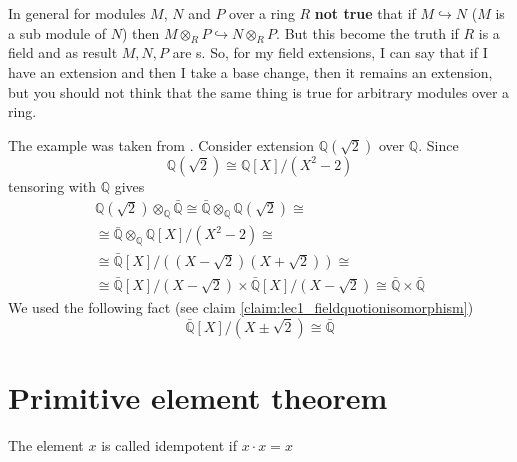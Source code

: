 \begin{remark}
In general for modules $M$, $N$ and $P$ over a ring $R$ \textbf{not true} that
if $M \hookrightarrow N$ ($M$ is a sub module of $N$) then
$M \otimes_R P \hookrightarrow N \otimes_R P$. But this become the
truth if $R$ is a field and as result $M,N,P$ are
s. So, for my field extensions, I can say
that if I have an extension and then I take a base change, then it
remains an extension, but  you should not think that the same thing is
true for arbitrary modules over a ring.  
\end{remark}

\begin{myexample}
  The example was taken from \cite{bib:KeithConradSeparability2}.
  Consider extension $\mathbb{Q}\left(\sqrt{2}\right)$ over
  $\mathbb{Q}$. Since
  \[
  \mathbb{Q}\left(\sqrt{2}\right) \cong
  \mathbb{Q}\left[X\right]/\left(X^2 - 2\right)
  \]
  tensoring with $\mathbb{Q}$ gives
  \begin{eqnarray}
    \mathbb{Q}\left(\sqrt{2}\right) \otimes_{\mathbb{Q}}
    \bar{\mathbb{Q}} \cong
    \bar{\mathbb{Q}} \otimes_{\mathbb{Q}}
    \mathbb{Q}\left(\sqrt{2}\right)
    \cong
    \nonumber \\
    \cong
    \bar{\mathbb{Q}} \otimes_{\mathbb{Q}}
    \mathbb{Q}\left[X\right]/\left(X^2 - 2\right)
    \cong
    \nonumber \\
    \cong
    \bar{\mathbb{Q}}\left[X\right]/
    \left(
    \left(X - \sqrt{2}\right)
    \left(X + \sqrt{2}\right)
    \right)
    \cong
    \nonumber \\
    \cong
    \bar{\mathbb{Q}}\left[X\right]/\left(X - \sqrt{2}\right)
    \times
    \bar{\mathbb{Q}}\left[X\right]/\left(X - \sqrt{2}\right)
    \cong
    \bar{\mathbb{Q}} \times \bar{\mathbb{Q}}
    \nonumber
  \end{eqnarray}
  We used the following fact (see claim
  \ref{claim:lec1_fieldquotionisomorphism}) 
  \[
  \bar{\mathbb{Q}}\left[X\right]/\left(X \pm \sqrt{2}\right)
  \cong
  \bar{\mathbb{Q}}
  \]  
  \label{ex:lec5_conrad}
\end{myexample}

\section{Primitive element theorem}

\begin{definition}[Idempotent]
  The element $x$ is called idempotent if $x \cdot x = x$
  \label{def:idempotent}
\end{definition}

